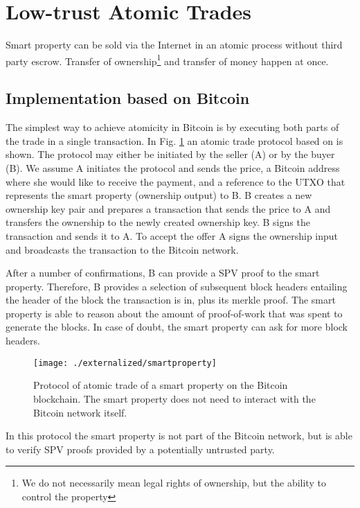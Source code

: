 \section{Low-trust Atomic Trades}

Smart property can be sold via the Internet in an atomic process without third party escrow. Transfer of ownership\footnote{We do not necessarily mean legal rights of ownership, but the ability to control the property} and transfer of money happen at once.

\subsection{Implementation based on Bitcoin}

The simplest way to achieve atomicity in Bitcoin is by executing both parts of the trade in a single transaction. In Fig. \ref{fig:smartproperty} an atomic trade protocol based on \cite{smartproperty2011} is shown. The protocol may either be initiated by the seller (A) or by the buyer (B). We assume A initiates the protocol and sends the price, a Bitcoin address where she would like to receive the payment, and a reference to the \ac{UTXO} that represents the smart property (ownership output) to B. B creates a new ownership key pair and prepares a transaction that sends the price to A and transfers the ownership to the newly created ownership key. B signs the transaction and sends it to A. To accept the offer A signs the ownership input and broadcasts the transaction to the Bitcoin network. 

After a number of confirmations, B can provide a \ac{SPV} proof to the smart property. Therefore, B provides a selection of subsequent block headers entailing the header of the block the transaction is in, plus its merkle proof. The smart property is able to reason about the amount of proof-of-work that was spent to generate the blocks. In case of doubt, the smart property can ask for more block headers.

\begin{figure}[!t]
    \centering
    \texttt{[image: ./externalized/smartproperty]}
    \caption{Protocol of atomic trade of a smart property on the Bitcoin blockchain. The smart property does not need to interact with the Bitcoin network itself.}
    \label{fig:smartproperty}
  \end{figure}

In this protocol the smart property is not part of the Bitcoin network, but is able to verify \ac{SPV} proofs provided by a potentially untrusted party. 

